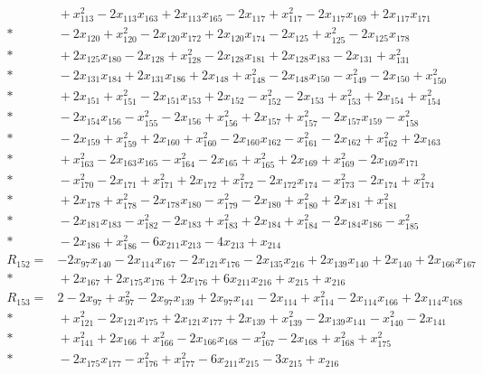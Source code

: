 \documentclass[11pt]{article}
\theoremstyle{remark}\newtheorem{remark}[theorem]{Remark}
\begin{document}
\begin{align*}
&{} + x_{113}^{2} - 2x_{113}x_{163} + 2x_{113}x_{165} - 2x_{117} + x_{117}^{2} - 2x_{117}x_{169} + 2x_{117}x_{171} \\*
&{} - 2x_{120} + x_{120}^{2} - 2x_{120}x_{172} + 2x_{120}x_{174} - 2x_{125} + x_{125}^{2} - 2x_{125}x_{178} \\*
&{} + 2x_{125}x_{180} - 2x_{128} + x_{128}^{2} - 2x_{128}x_{181} + 2x_{128}x_{183} - 2x_{131} + x_{131}^{2} \\*
&{} - 2x_{131}x_{184} + 2x_{131}x_{186} + 2x_{148} + x_{148}^{2} - 2x_{148}x_{150} - x_{149}^{2} - 2x_{150} + x_{150}^{2} \\*
&{} + 2x_{151} + x_{151}^{2} - 2x_{151}x_{153} + 2x_{152} - x_{152}^{2} - 2x_{153} + x_{153}^{2} + 2x_{154} + x_{154}^{2} \\*
&{} - 2x_{154}x_{156} - x_{155}^{2} - 2x_{156} + x_{156}^{2} + 2x_{157} + x_{157}^{2} - 2x_{157}x_{159} - x_{158}^{2} \\*
&{} - 2x_{159} + x_{159}^{2} + 2x_{160} + x_{160}^{2} - 2x_{160}x_{162} - x_{161}^{2} - 2x_{162} + x_{162}^{2} + 2x_{163} \\*
&{} + x_{163}^{2} - 2x_{163}x_{165} - x_{164}^{2} - 2x_{165} + x_{165}^{2} + 2x_{169} + x_{169}^{2} - 2x_{169}x_{171} \\*
&{} - x_{170}^{2} - 2x_{171} + x_{171}^{2} + 2x_{172} + x_{172}^{2} - 2x_{172}x_{174} - x_{173}^{2} - 2x_{174} + x_{174}^{2} \\*
&{} + 2x_{178} + x_{178}^{2} - 2x_{178}x_{180} - x_{179}^{2} - 2x_{180} + x_{180}^{2} + 2x_{181} + x_{181}^{2} \\*
&{} - 2x_{181}x_{183} - x_{182}^{2} - 2x_{183} + x_{183}^{2} + 2x_{184} + x_{184}^{2} - 2x_{184}x_{186} - x_{185}^{2} \\*
&{} - 2x_{186} + x_{186}^{2} - 6x_{211}x_{213} - 4x_{213} + x_{214} \\[4pt]
R_{152} ={}& -2x_{97}x_{140} - 2x_{114}x_{167} - 2x_{121}x_{176} - 2x_{135}x_{216} + 2x_{139}x_{140} + 2x_{140} + 2x_{166}x_{167} \\*
&{} + 2x_{167} + 2x_{175}x_{176} + 2x_{176} + 6x_{211}x_{216} + x_{215} + x_{216} \\[4pt]
R_{153} ={}& 2 - 2x_{97} + x_{97}^{2} - 2x_{97}x_{139} + 2x_{97}x_{141} - 2x_{114} + x_{114}^{2} - 2x_{114}x_{166} + 2x_{114}x_{168} \\*
&{} + x_{121}^{2} - 2x_{121}x_{175} + 2x_{121}x_{177} + 2x_{139} + x_{139}^{2} - 2x_{139}x_{141} - x_{140}^{2} - 2x_{141} \\*
&{} + x_{141}^{2} + 2x_{166} + x_{166}^{2} - 2x_{166}x_{168} - x_{167}^{2} - 2x_{168} + x_{168}^{2} + x_{175}^{2} \\*
&{} - 2x_{175}x_{177} - x_{176}^{2} + x_{177}^{2} - 6x_{211}x_{215} - 3x_{215} + x_{216}
\end{align*}
\endgroup
\end{document}
